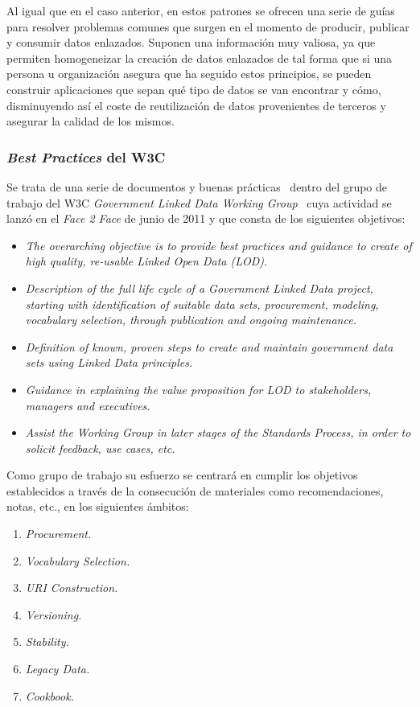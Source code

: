 Al igual que en el caso anterior, en estos patrones se ofrecen una serie de guías para resolver problemas comunes
que surgen en el momento de producir, publicar y consumir datos enlazados. Suponen una información muy valiosa, ya que
permiten homogeneizar la creación de datos enlazados de tal forma que si una persona u organización asegura que ha 
seguido estos principios, se pueden construir aplicaciones que sepan qué tipo de datos se van encontrar y cómo, disminuyendo
así el coste de reutilización de datos provenientes de terceros y asegurar la calidad de los mismos.

\subsubsection{\textit{Best Practices} del W3C}
Se trata de una serie de documentos y buenas prácticas~\cite{best-gld} dentro del 
grupo de trabajo del \gls{W3C} \textit{Government Linked Data Working Group}~\cite{gld-group} cuya actividad se lanzó
 en el \textit{Face 2 Face} de junio de 2011 y que consta de los siguientes objetivos:

\begin{itemize}
 \item \textit{The overarching objective is to provide best practices and guidance to create of high quality, re-usable Linked Open Data (LOD)}.
 \item \textit{Description of the full life cycle of a Government Linked Data project, starting with identification of suitable data sets, procurement, modeling, vocabulary selection, through publication and ongoing maintenance.}
 \item \textit{Definition of known, proven steps to create and maintain government data sets using Linked Data principles.}
  \item \textit{Guidance in explaining the value proposition for LOD to stakeholders, managers and executives.}
  \item \textit{Assist the Working Group in later stages of the Standards Process, in order to solicit feedback, use cases, etc.}
\end{itemize}

Como grupo de trabajo su esfuerzo se centrará en cumplir los objetivos establecidos a través de la consecución de materiales como 
recomendaciones, notas, etc., en los siguientes ámbitos:
\begin{enumerate}
 \item  \textit{Procurement.}
 \item  \textit{Vocabulary Selection.}
 \item \textit{URI Construction.}
   \item \textit{Versioning.}
   \item \textit{Stability.}
   \item \textit{Legacy Data.}
   \item \textit{Cookbook.} 
\end{enumerate}

